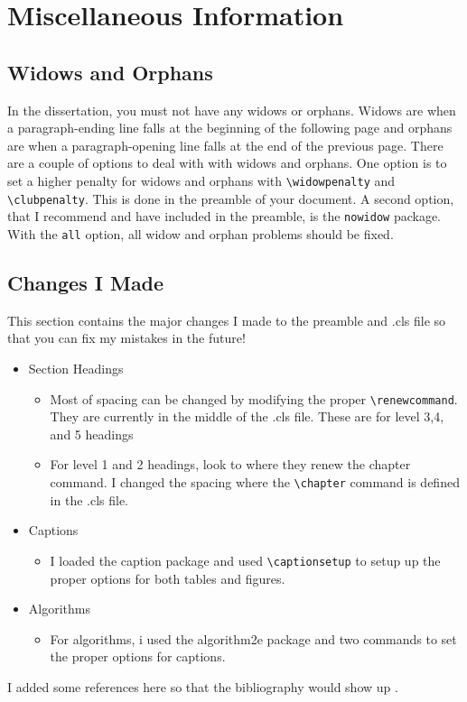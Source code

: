 \chapter{Miscellaneous Information}

\section{Widows and Orphans}

In the dissertation, you must not have any widows or orphans. Widows are when a paragraph-ending line falls at the beginning of the following page and orphans are when a paragraph-opening line falls at the end of the previous page. There are a couple of options to deal with with widows and orphans. One option is to set a higher penalty for widows and orphans with \verb|\widowpenalty| and \verb|\clubpenalty|. This is done in the preamble of your document. A second option, that I recommend and have included in the preamble, is the \verb|nowidow| package. With the \verb|all| option, all widow and orphan problems should be fixed. 

\section{Changes I Made}

This section contains the major changes I made to the preamble and .cls file so that you can fix my mistakes in the future!

\begin{itemize}
	\item Section Headings
	\begin{itemize}
		\item Most of spacing can be changed by modifying the proper \verb|\renewcommand|. They are currently in the middle of the .cls file. These are for level 3,4, and 5 headings
		\item For level 1 and 2 headings, look to where they renew the chapter command. I changed the spacing where the \verb|\chapter| command is defined in the .cls file. 
	\end{itemize}
	\item Captions
	\begin{itemize}
		\item I loaded the caption package and used \verb|\captionsetup| to setup up the proper options for both tables and figures. 
	\end{itemize}
	\item Algorithms
	\begin{itemize}
		\item For algorithms, i used the algorithm2e package and two commands to set the proper options for captions.
	\end{itemize}
\end{itemize}

I added some references here so that the bibliography would show up \citep{agresti2003, fisher1925statistical, darroch1980markov}.
